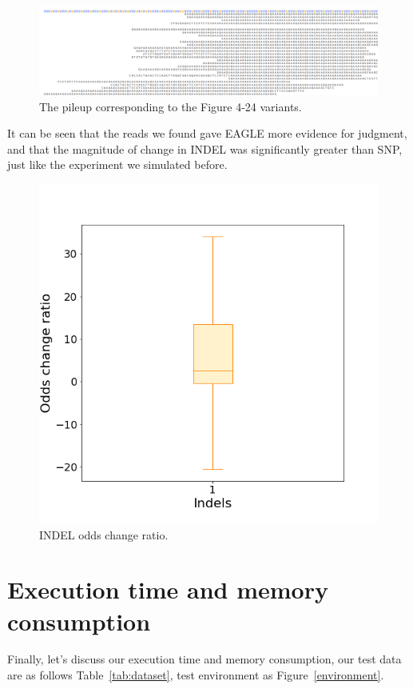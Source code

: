 \begin{figure}[H]
\centering
\includegraphics[width=1\columnwidth]{body/image/indel_pileup_REFread.png}
\caption[Figure 4.24 pileup]{The pileup corresponding to the Figure 4-24 variants.}
\label{indel_pileup_REFread}
\end{figure}

It can be seen that the reads we found gave EAGLE more evidence for judgment, and that the magnitude of change in INDEL was significantly greater than SNP, just like the experiment we simulated before.

\begin{figure}[H]
\centering
\includegraphics[width=0.6\columnwidth]{body/image/indel_odds_change.png}
\caption[INDEL odds change ratio]{INDEL odds change ratio.}
\label{indel_odds_change}
\end{figure}

\section{Execution time and memory consumption}

Finally, let’s discuss our execution time and memory consumption, our test data are as follows Table~\ref{tab:dataset}, test environment as Figure~\ref{environment}.

